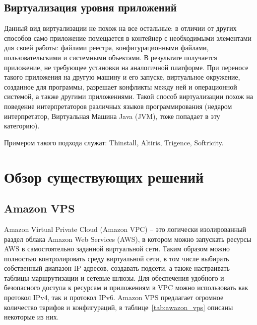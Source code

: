 \subsection{Виртуализация уровня приложений}\label{sec:app_level_virt}
Данный вид виртуализации не похож на все остальные: в отличии от других способов само приложение помещается в контейнер с необходимыми элементами для своей работы: файлами реестра, конфигурационными файлами, пользовательскими и системными объектами. В результате получается приложение, не требующее установки на аналогичной платформе. При переносе такого приложения на другую машину и его запуске, виртуальное окружение, созданное для программы, разрешает конфликты между ней и операционной системой, а также другими приложениями. Такой способ виртуализации похож на поведение интерпретаторов различных языков программирования (недаром интерпретатор, Виртуальная Машина Java (JVM), тоже попадает в эту категорию).

Примером такого подхода служат: Thinstall, Altiris, Trigence, Softricity. 

\section{Обзор существующих решений}\label{sec:ch1/sec3}
\subsection{Amazon VPS}\label{sec:amazon}
Amazon Virtual Private Cloud (Amazon VPC) – это логически изолированный раздел облака Amazon Web Services (AWS), в котором можно запускать ресурсы AWS в самостоятельно заданной виртуальной сети. Таким образом можно полностью контролировать среду виртуальной сети, в том числе выбирать собственный диапазон IP‑адресов, создавать подсети, а также настраивать таблицы маршрутизации и сетевые шлюзы. Для обеспечения удобного и безопасного доступа к ресурсам и приложениям в VPC можно использовать как протокол IPv4, так и протокол IPv6.
\newline
Amazon VPS предлагает огромное количество тарифов и конфигураций, в таблице~\ref{tab:awazon_vps} описаны некоторые из них.

